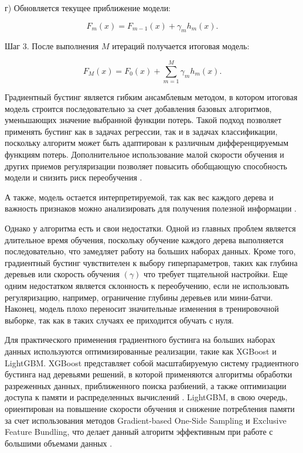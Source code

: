 г) Обновляется текущее приближение модели:

\begin{equation}
  F_m(x) = F_{m-1}(x) + \gamma_m h_m(x).
\end{equation}

Шаг 3. После выполнения $M$ итераций получается итоговая модель:

\begin{equation}
  F_M(x) = F_0(x) + \sum_{m=1}^{M} \gamma_m h_m(x).
\end{equation}

Градиентный бустинг является гибким ансамблевым методом, в котором итоговая модель строится последовательно за счет добавления базовых алгоритмов, уменьшающих значение выбранной функции потерь. Такой подход позволяет применять бустинг как в задачах регрессии, так и в задачах классификации, поскольку алгоритм может быть адаптирован к различным дифференцируемым функциям потерь. Дополнительное использование малой скорости обучения и других приемов регуляризации позволяет повысить обобщающую способность модели и снизить риск переобучения \cite{HastieElementsBoosting}.

А также, модель остается интерпретируемой, так как вес каждого дерева и важность признаков можно анализировать для получения полезной информации \cite{Lebedev}.

Однако у алгоритма есть и свои недостатки. Одной из главных проблем является длительное время обучения, поскольку обучение каждого дерева выполняется последовательно, что замедляет работу на больших наборах данных. Кроме того, градиентный бустинг чувствителен к выбору гиперпараметров, таких как глубина деревьев или скорость обучения $(\gamma)$ что требует тщательной настройки. Еще одним недостатком является склонность к переобучению, если не использовать регуляризацию, например, ограничение глубины деревьев или мини-батчи. Наконец, модель плохо переносит значительные изменения в тренировочной выборке, так как в таких случаях ее приходится обучать с нуля.

Для практического применения градиентного бустинга на больших наборах данных используются оптимизированные реализации, такие как XGBoost и LightGBM. XGBoost представляет собой масштабируемую систему градиентного бустинга над деревьями решений, в которой применяются алгоритмы обработки разреженных данных, приближенного поиска разбиений, а также оптимизации доступа к памяти и распределенных вычислений \cite{ChenXGBoost}. LightGBM, в свою очередь, ориентирован на повышение скорости обучения и снижение потребления памяти за счет использования методов Gradient-based One-Side Sampling и Exclusive Feature Bundling, что делает данный алгоритм эффективным при работе с большими объемами данных \cite{KeLightGBM}.


